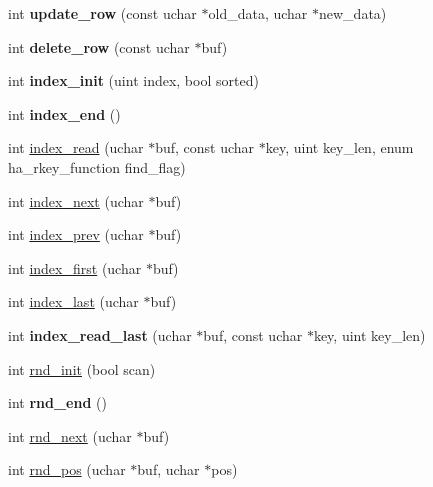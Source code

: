 \begin{DoxyCompactItemize}
int {\bfseries update\+\_\+row} (const uchar $\ast$old\+\_\+data, uchar $\ast$new\+\_\+data)
\item 
\mbox{\label{classha__ndbcluster_a47cd9427fba75e9340dc3572b1798901}} 
int {\bfseries delete\+\_\+row} (const uchar $\ast$buf)
\item 
\mbox{\label{classha__ndbcluster_ae705539c642116cf2fb1f4e325d74892}} 
int {\bfseries index\+\_\+init} (uint index, bool sorted)
\item 
\mbox{\label{classha__ndbcluster_aaa2a69f18014dc4e424beefb06bd4155}} 
int {\bfseries index\+\_\+end} ()
\item 
int \mbox{\hyperlink{classha__ndbcluster_a0fc1fdfefdf8315fca2ebac5ad296e08}{index\+\_\+read}} (uchar $\ast$buf, const uchar $\ast$key, uint key\+\_\+len, enum ha\+\_\+rkey\+\_\+function find\+\_\+flag)
\item 
int \mbox{\hyperlink{classha__ndbcluster_a865afdc25ee4ca42fafde872e476e0ff}{index\+\_\+next}} (uchar $\ast$buf)
\item 
int \mbox{\hyperlink{classha__ndbcluster_a824559f84d7f256052f0394e9276774f}{index\+\_\+prev}} (uchar $\ast$buf)
\item 
int \mbox{\hyperlink{classha__ndbcluster_a1d3598345c3543f684c566f79a61cedc}{index\+\_\+first}} (uchar $\ast$buf)
\item 
int \mbox{\hyperlink{classha__ndbcluster_a6f6e9347ec700ee952a998fa88ae68b2}{index\+\_\+last}} (uchar $\ast$buf)
\item 
\mbox{\label{classha__ndbcluster_a95ff7d09fb74bbdde730f809d3f14021}} 
int {\bfseries index\+\_\+read\+\_\+last} (uchar $\ast$buf, const uchar $\ast$key, uint key\+\_\+len)
\item 
int \mbox{\hyperlink{classha__ndbcluster_acb923144766720049d59f97cd70286fd}{rnd\+\_\+init}} (bool scan)
\item 
\mbox{\label{classha__ndbcluster_a1248b6b7c4b6515a2dafd930d57bcd4b}} 
int {\bfseries rnd\+\_\+end} ()
\item 
int \mbox{\hyperlink{classha__ndbcluster_adc93bae43a800cc5ba5057b306136de1}{rnd\+\_\+next}} (uchar $\ast$buf)
\item 
int \mbox{\hyperlink{classha__ndbcluster_a8980053ce56e386ced321a1ad88d1cc2}{rnd\+\_\+pos}} (uchar $\ast$buf, uchar $\ast$pos)

\end{DoxyCompactItemize}
